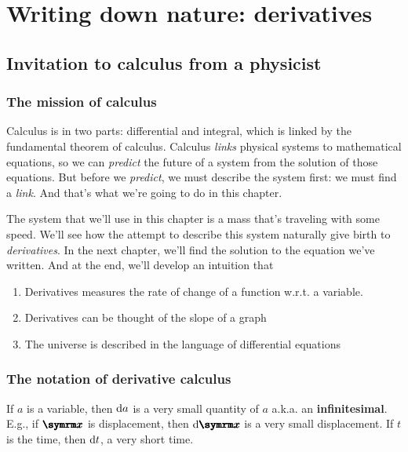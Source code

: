 \chapter{Writing down nature: derivatives}
\label{sec:derivatives}

\section{Invitation to calculus from a physicist}


\subsection{The mission of calculus}

Calculus is in two parts: differential and integral, which is linked by the fundamental theorem of calculus. Calculus \emph{links} physical systems to mathematical equations, so we can \emph{predict} the future of a system from the solution of those equations. But before we \emph{predict}, we must describe the system first: we must find a \emph{link}. And that's what we're going to do in this chapter.

The system that we'll use in this chapter is a mass that's traveling with some speed. We'll see how the attempt to describe this system naturally give birth to \emph{derivatives}. In the next chapter, we'll find the solution to the equation we've written. And at the end, we'll develop an intuition that
\begin{enumerate}[noitemsep]
    \item Derivatives measures the rate of change of a function w.r.t. a variable.
    \item Derivatives can be thought of the slope of a graph
    \item The universe is described in the language of differential equations
\end{enumerate}

\subsection{The notation of derivative calculus}
\label{sec:notation_of_calculus_derivative}

If $a$ is a variable, then $\odif{a}$ is a very small quantity of $a$ a.k.a. an \textbf{infinitesimal}. E.g., if $\vv{x}$ is displacement, then $\odif{\vv{x}}$ is a very small displacement. If $t$ is the time, then $\odif{t}$, a very short time.

